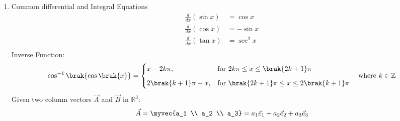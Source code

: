\begin{enumerate}[label=\thesubsection.\arabic*, ref=\thesubsection.\theenumi]
	\item Common differential and Integral Equations
	\begin{align}
		\frac{d}{dx}(\sin x) &= \cos x \label{eq:sindif}\\
		\frac{d}{dx}(\cos x) &= -\sin x \label{eq:cosdif} \\
		\frac{d}{dx}(\tan x) &= \sec^2 x \label{eq:tandiff}\\
	\end{align}
	Inverse Function:
	\begin{align}
		\cos^{-1}\brak{\cos\brak{x}} = \begin{cases}
			x - 2k\pi, & \text{for } 2k\pi \le x \le \brak{2k+1}\pi \\[6pt]
			2\brak{k+1}\pi - x, & \text{for } \brak{2k+1}\pi \le x \le 2\brak{k+1}\pi
		\end{cases} \quad \text{where } k \in \mathbb{Z} \label{eq:inverse}
		\end{align}
		Given two column vectors $\vec{A}$ and $\vec{B}$ in $\mathbb{R}^3$:
		\begin{align}
			\vec{A} = \myvec {a_1 \\ a_2 \\ a_3} =a_1 \vec{e}_1 + a_2 \vec{e}_2 + a_3 \vec{e}_3
		\end{align}
		

\end{enumerate}
